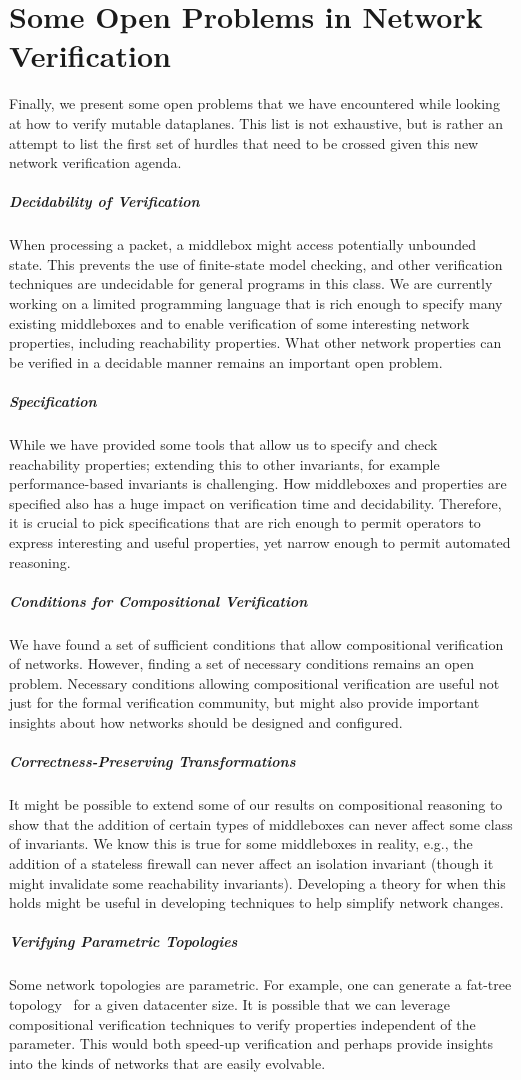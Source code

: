 \section{Some Open Problems in Network Verification}
Finally, we present some open problems that we have encountered while looking at how to verify mutable dataplanes. This list is not 
exhaustive, but is rather an attempt to list the first set of hurdles that need to be crossed given this new network verification agenda.

\subparagraph*{Decidability of Verification} When processing a packet, a middlebox might access potentially unbounded state. This prevents the use
of finite-state model checking, and other verification techniques are undecidable for general programs in this class. We are
currently working on a limited programming language that is rich enough to specify many existing middleboxes and to enable verification of some interesting network properties, including reachability properties. What other network properties can be verified in a decidable manner remains an important open problem.

\subparagraph*{Specification} While we have provided some tools
that allow us to specify and check reachability properties; extending this to other invariants, for example performance-based
invariants is challenging. How middleboxes and properties are specified also has a huge impact on verification time and
decidability. Therefore, it is crucial to pick specifications that are rich enough to permit operators to express interesting and
useful properties, yet narrow enough to permit automated reasoning.

\subparagraph*{Conditions for Compositional Verification} We have found a set of sufficient conditions that allow compositional verification of networks. However,
finding a set of necessary conditions remains an open problem. Necessary conditions allowing compositional verification are useful not just for the formal verification community, but might also provide important insights about how networks should be designed and configured.

\subparagraph*{Correctness-Preserving Transformations} It might be possible to extend some of our results on compositional reasoning to show that the addition of certain types of middleboxes
can never affect some class of invariants. We know this is true for some middleboxes in reality, e.g., the addition of a stateless firewall
can never affect an isolation invariant (though it might invalidate some reachability invariants). Developing a theory for when this 
holds might be useful in developing techniques to help simplify network changes. 

\subparagraph*{Verifying Parametric Topologies} Some network topologies are parametric. For example, one can generate a fat-tree topology~\cite{al2008scalable} for a given datacenter size. It is possible that we can leverage compositional verification techniques to verify properties independent of the parameter. This would both speed-up verification and perhaps provide insights into the kinds of networks that are easily evolvable.